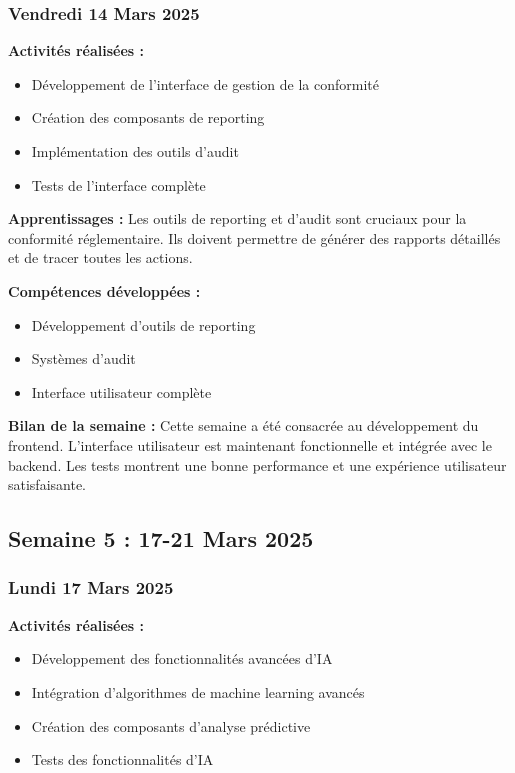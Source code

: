 \documentclass[12pt,a4paper]{article}
\begin{document}
\subsubsection{Vendredi 14 Mars 2025}
\textbf{Activités réalisées :}
\begin{itemize}
    \item Développement de l'interface de gestion de la conformité
    \item Création des composants de reporting
    \item Implémentation des outils d'audit
    \item Tests de l'interface complète
\end{itemize}

\textbf{Apprentissages :}
Les outils de reporting et d'audit sont cruciaux pour la conformité réglementaire. Ils doivent permettre de générer des rapports détaillés et de tracer toutes les actions.

\textbf{Compétences développées :}
\begin{itemize}
    \item Développement d'outils de reporting
    \item Systèmes d'audit
    \item Interface utilisateur complète
\end{itemize}

\textbf{Bilan de la semaine :}
Cette semaine a été consacrée au développement du frontend. L'interface utilisateur est maintenant fonctionnelle et intégrée avec le backend. Les tests montrent une bonne performance et une expérience utilisateur satisfaisante.

\clearpage
\subsection{Semaine 5 : 17-21 Mars 2025}

\subsubsection{Lundi 17 Mars 2025}
\textbf{Activités réalisées :}
\begin{itemize}
    \item Développement des fonctionnalités avancées d'IA
    \item Intégration d'algorithmes de machine learning avancés
    \item Création des composants d'analyse prédictive
    \item Tests des fonctionnalités d'IA
\end{itemize}
\end{document}

